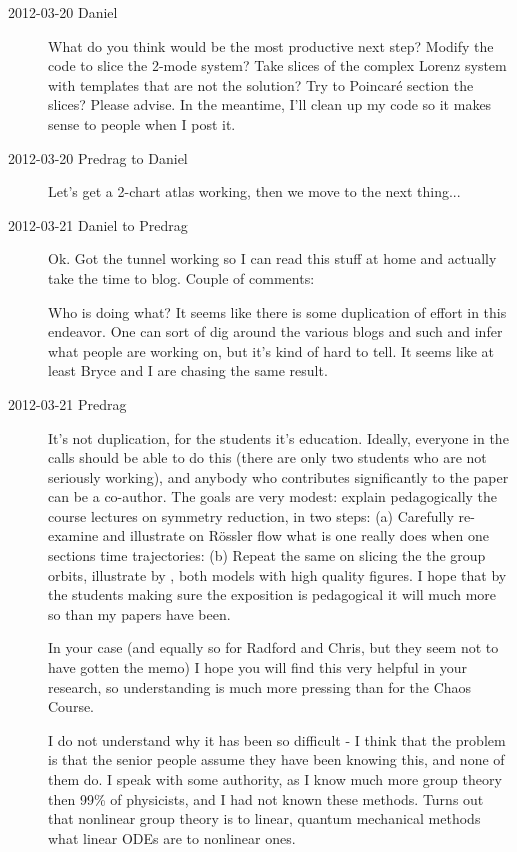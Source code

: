 \begin{description}
\item[2012-03-20 Daniel]
What do you think would be the most productive next step? Modify the code
to slice the 2-mode system? Take slices of the complex Lorenz system with
templates that are not the {\eqv} solution? Try to Poincar\'e
section the slices? Please advise. In the meantime, I'll clean up my code
so it makes sense to people when I post it.

\item[2012-03-20 Predrag  to Daniel] Let's get a 2-chart atlas working, then
we move to the next thing...

\item[2012-03-21 Daniel  to Predrag] Ok. Got the tunnel working so I can
read this stuff at home and actually take the time to blog. Couple of
comments:

Who is doing what? It seems like there is some duplication of effort in
this endeavor. One can sort of dig around the various blogs and such and
infer what people are working on, but it's kind of hard to tell. It seems
like at least Bryce and I are chasing the same result.

\item[2012-03-21 Predrag]
It's not duplication, for the students it's education. Ideally, everyone
in the calls should be able to do this (there are only two students who
are not seriously working), and anybody who contributes significantly to
the paper can be a co-author. The goals are very modest: explain
pedagogically the course lectures on symmetry reduction, in two steps:
(a) Carefully re-examine and illustrate on R\"ossler flow what is one
really does when one sections time trajectories: (b) Repeat the same on
slicing the the group orbits, illustrate by \cLf, both models with high
quality figures. I hope that by the students making sure the exposition
is pedagogical it will much more so than my papers have been.

In your case (and equally so for Radford and Chris, but they seem not to
have gotten the memo) I hope you will find this very helpful in your
research, so understanding is much more pressing than for the Chaos
Course.

I do not understand why it has been so difficult - I think that the
problem is that the senior people assume they have been knowing this, and
none of them do. I speak with some authority, as I know much more group
theory then 99\% of physicists, and I had not known these methods. Turns out
that nonlinear group theory is to linear, quantum mechanical methods what
linear ODEs are to nonlinear ones.


\end{description}
